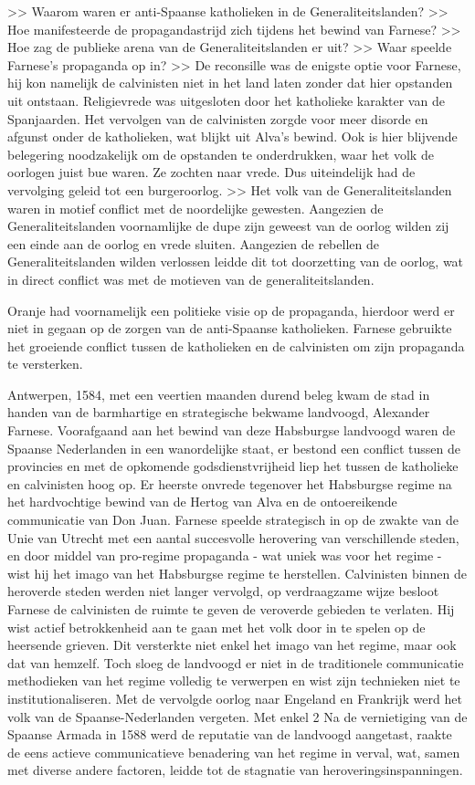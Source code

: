 \documentclass[11pt]{amsart}
\begin{document}
>> Waarom waren er anti-Spaanse katholieken in de Generaliteitslanden?
>> Hoe manifesteerde de propagandastrijd zich tijdens het bewind van Farnese?
>> Hoe zag de publieke arena van de Generaliteitslanden er uit?
>> Waar speelde Farnese's propaganda op in?
>> De reconsille was de enigste optie voor Farnese, hij kon namelijk de calvinisten niet in het land laten zonder dat hier opstanden uit ontstaan. Religievrede was uitgesloten door het katholieke karakter van de Spanjaarden. Het vervolgen van de calvinisten zorgde voor meer disorde en afgunst onder de katholieken, wat blijkt uit Alva's bewind. Ook is hier blijvende belegering noodzakelijk om de opstanden te onderdrukken, waar het volk de oorlogen juist bue waren. Ze zochten naar vrede. Dus uiteindelijk had de vervolging geleid tot een burgeroorlog.
>> Het volk van de Generaliteitslanden waren in motief conflict met de noordelijke gewesten. Aangezien de Generaliteitslanden voornamlijke de dupe zijn geweest van de oorlog wilden zij een einde aan de oorlog en vrede sluiten. Aangezien de rebellen de Generaliteitslanden wilden verlossen leidde dit tot doorzetting van de oorlog, wat in direct conflict was met de motieven van de generaliteitslanden. 


Oranje had voornamelijk een politieke visie op de propaganda, hierdoor werd er niet in gegaan op de zorgen van de
anti-Spaanse katholieken. Farnese gebruikte het groeiende conflict tussen de katholieken en de calvinisten om zijn
propaganda te versterken.

\noindent Antwerpen, 1584, met een veertien maanden durend beleg kwam de stad in handen van de barmhartige en
strategische bekwame landvoogd, Alexander Farnese. Voorafgaand aan het bewind van deze Habsburgse landvoogd waren de
Spaanse Nederlanden in een wanordelijke staat, er bestond een conflict tussen de provincies en met de opkomende
godsdienstvrijheid liep het tussen de katholieke en calvinisten hoog op. Er heerste
onvrede tegenover het Habsburgse regime na het hardvochtige bewind van de Hertog van Alva en de ontoereikende communicatie van Don Juan.
Farnese speelde strategisch in op de zwakte van de Unie van Utrecht met een
aantal succesvolle herovering van verschillende steden, en door middel van pro-regime propaganda - wat uniek was voor
het regime - wist hij het imago van het Habsburgse regime te herstellen. Calvinisten binnen de heroverde steden werden
niet langer vervolgd, op verdraagzame wijze besloot Farnese de calvinisten de ruimte te geven de veroverde gebieden te verlaten.
Hij wist actief betrokkenheid aan te gaan met het volk door in te spelen op de heersende grieven. Dit versterkte niet
enkel het imago van het regime, maar ook dat van hemzelf. Toch sloeg de landvoogd er niet in de traditionele communicatie
methodieken van het regime volledig te verwerpen en wist zijn technieken niet te institutionaliseren.
Met de vervolgde oorlog naar Engeland en Frankrijk werd het volk van de Spaanse-Nederlanden vergeten. Met enkel 2
Na de vernietiging van de Spaanse Armada in 1588 werd de reputatie van de landvoogd aangetast, raakte de 
eens actieve communicatieve benadering van het regime in verval, wat, samen met diverse andere factoren, 
leidde tot de stagnatie van heroveringsinspanningen.
\end{document}
